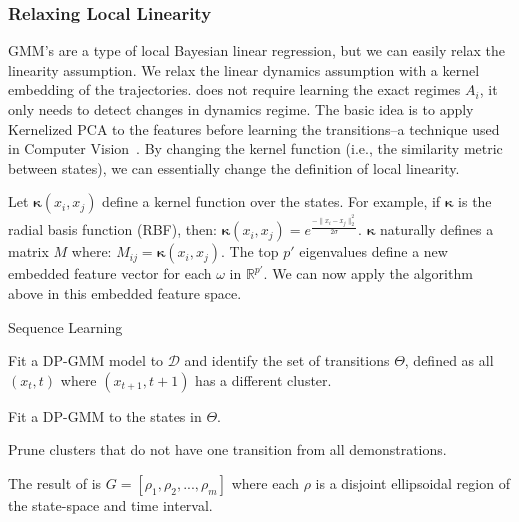 \subsubsection{Relaxing Local Linearity}
GMM's are a type of local Bayesian linear regression, but we can easily relax the linearity assumption.
We relax the linear dynamics assumption with a kernel embedding of the trajectories.
\hirl does not require learning the exact regimes $A_i$,  it only needs to detect changes in dynamics regime.
The basic idea is to apply Kernelized PCA to the features before learning the transitions--a technique used in Computer Vision~\cite{DBLP:conf/nips/MikaSSMSR98}.
By changing the kernel function (i.e., the similarity metric between states), we can essentially change the definition of local linearity.

Let $\mathbf{\kappa}(x_i,x_j)$ define a kernel function over the states.
For example, if $\mathbf{\kappa}$ is the radial basis function (RBF), then:
$ \mathbf{\kappa}(x_i,x_j) = e^{\frac{-\|x_i-x_j\|_2^2}{2\sigma}}$.
$\mathbf{\kappa}$ naturally defines a matrix $M$ where: $M_{ij} = \mathbf{\kappa}(x_i,x_j)$. 
The top $p'$ eigenvalues define a new embedded feature vector for each $\omega$ in $\mathbb{R}^{p'}$.
We can now apply the algorithm above in this embedded feature space.

\begin{phase}[t]
\small
\DontPrintSemicolon
\caption{Sequence Learning \label{alg:tsh1}}

Fit a DP-GMM model to $\mathcal{D}$ and identify the set of transitions $\Theta$, defined as all $(x_t,t)$  where  $(x_{t+1},t+1)$  has a different cluster.

Fit a DP-GMM to the states in $\Theta$.

Prune clusters that do not have one transition from all demonstrations.

The result of is $G = [\rho_1, \rho_2,...,\rho_m]$ where each $\rho$ is a disjoint ellipsoidal region of the state-space and time interval.

\end{phase}
